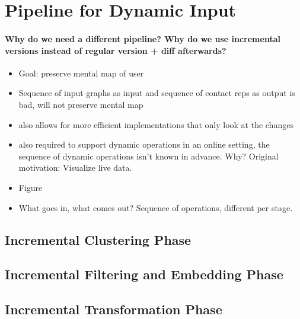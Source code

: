 \section{Pipeline for Dynamic Input}
\label{sect:pipeline-for-dynamic-input}

\paragraph{Why do we need a different pipeline? Why do we use incremental versions instead of regular version + diff afterwards?}
\begin{itemize}
	\item Goal: preserve mental map of user
	\item Sequence of input graphs as input and sequence of contact reps as output is bad, will not preserve mental map
	\item also allows for more efficient implementations that only look at the changes
	\item also required to support dynamic operations in an online setting, \ie{} the sequence of dynamic operations isn't known in advance. Why? Original motivation: Visualize live data.
\end{itemize}

\begin{itemize}
	\item Figure
	\item What goes in, what comes out? Sequence of operations, different per stage.
\end{itemize}


\subsection{Incremental Clustering Phase}

\subsection{Incremental Filtering and Embedding Phase}

\subsection{Incremental Transformation Phase}
